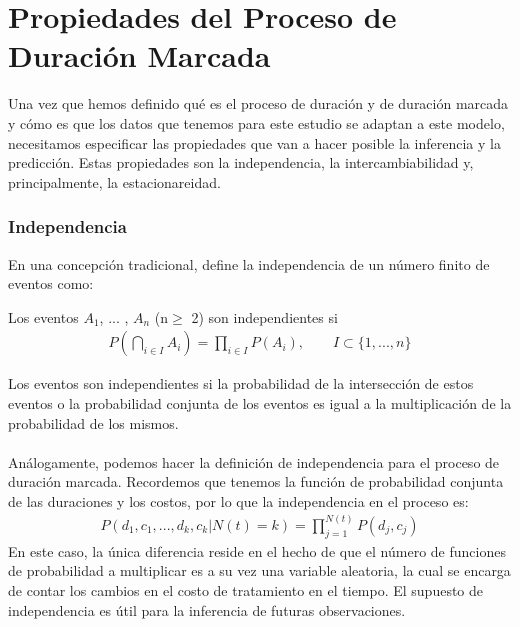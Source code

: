 \section{Propiedades del Proceso de Duraci\'on Marcada}
Una vez que hemos definido qu\'e es el proceso de duraci\'on y de duraci\'on marcada y c\'omo es que los datos que tenemos para este estudio se adaptan a este modelo, necesitamos especificar las propiedades que van a hacer posible la inferencia y la predicci\'on. Estas propiedades son la independencia, la intercambiabilidad y, principalmente, la estacionareidad.
\subsubsection{Independencia}
En una concepci\'on tradicional, \cite{resnickpath} define la independencia de un n\'umero finito de eventos como:\\
\begin{defi}
Los eventos $A_1$, ... , $A_n$ (n$\geq$ 2) son independientes si
\begin{align}
P(\bigcap_{i \in I} A_i) = \prod_{i \in I} P(A_i), \qquad I \subset\{1,...,n\} \nonumber
\end{align}
\end{defi}
Los eventos son independientes si la probabilidad de la intersecci\'on de estos eventos o la probabilidad conjunta de los eventos es igual a la multiplicaci\'on de la probabilidad de los mismos.\\
\\
An\'alogamente, podemos hacer la definici\'on de independencia para el proceso de duraci\'on marcada. Recordemos que tenemos la funci\'on de probabilidad conjunta de las duraciones y los costos, por lo que la independencia en el proceso es:
\begin{align}
P(d_1,c_1,...,d_k,c_k|N(t)=k)=\prod_{j=1}^{N(t)} P(d_j,c_j)
\end{align}
En este caso, la \'unica diferencia reside en el hecho de que el n\'umero de funciones de probabilidad a multiplicar es a su vez una variable aleatoria, la cual se encarga de contar los cambios en el costo de tratamiento en el tiempo. El supuesto de independencia es \'util para la inferencia de futuras observaciones.
